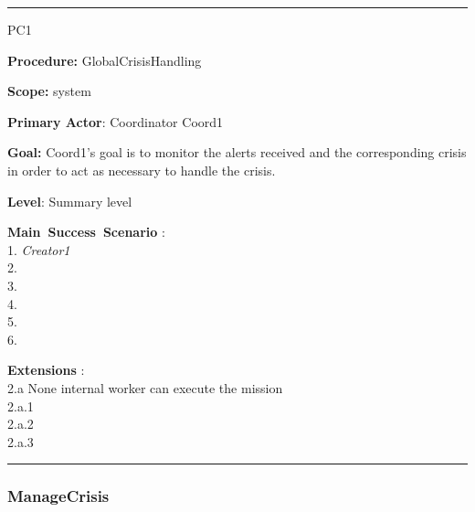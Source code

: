 \hrule
\begin{lyxlist}{PC1}
\small{
\item [\textbf{Procedure:}] GlobalCrisisHandling 
\item [\textbf{Scope:}] system
\item [\textbf{Primary Actor}:] Coordinator Coord1
\item [\textbf{Goal:}] Coord1’s goal is to monitor the alerts
received and the corresponding crisis in order to act as necessary to handle the crisis.
\item [\textbf{Level}:] Summary level
\item [\textbf{Main~Success~Scenario}]:\\
1. \emph{Creator1} \\
2. \\
3. \\
4. \\
5. \\
6. 


\item [\textbf{Extensions}]:\\
2.a None internal worker can execute the mission\\
\hspace*{0.5cm} 2.a.1 \\
\hspace*{0.5cm} 2.a.2 \\
\hspace*{0.5cm} 2.a.3 \\

}

\end{lyxlist}
\hrule

\subsubsection{ManageCrisis}

